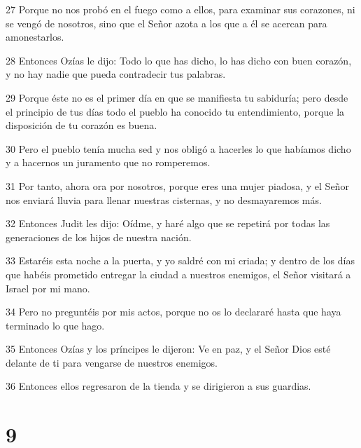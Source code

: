 \par 27 Porque no nos probó en el fuego como a ellos, para examinar sus corazones, ni se vengó de nosotros, sino que el Señor azota a los que a él se acercan para amonestarlos.
\par 28 Entonces Ozías le dijo: Todo lo que has dicho, lo has dicho con buen corazón, y no hay nadie que pueda contradecir tus palabras.
\par 29 Porque éste no es el primer día en que se manifiesta tu sabiduría; pero desde el principio de tus días todo el pueblo ha conocido tu entendimiento, porque la disposición de tu corazón es buena.
\par 30 Pero el pueblo tenía mucha sed y nos obligó a hacerles lo que habíamos dicho y a hacernos un juramento que no romperemos.
\par 31 Por tanto, ahora ora por nosotros, porque eres una mujer piadosa, y el Señor nos enviará lluvia para llenar nuestras cisternas, y no desmayaremos más.
\par 32 Entonces Judit les dijo: Oídme, y haré algo que se repetirá por todas las generaciones de los hijos de nuestra nación.
\par 33 Estaréis esta noche a la puerta, y yo saldré con mi criada; y dentro de los días que habéis prometido entregar la ciudad a nuestros enemigos, el Señor visitará a Israel por mi mano.
\par 34 Pero no preguntéis por mis actos, porque no os lo declararé hasta que haya terminado lo que hago.
\par 35 Entonces Ozías y los príncipes le dijeron: Ve en paz, y el Señor Dios esté delante de ti para vengarse de nuestros enemigos.
\par 36 Entonces ellos regresaron de la tienda y se dirigieron a sus guardias.

\chapter{9}

